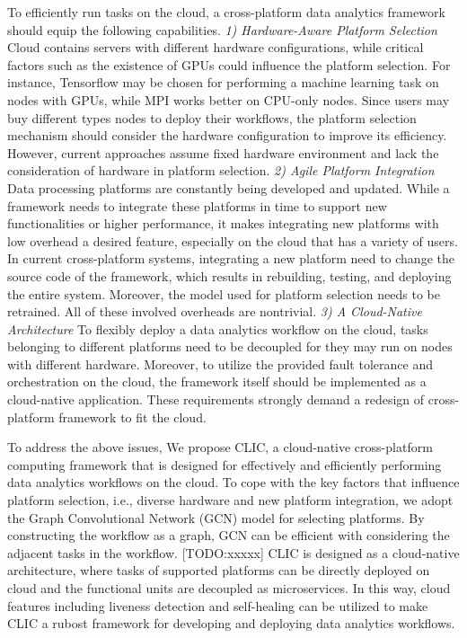 To efficiently run tasks on the cloud, a cross-platform data analytics framework should equip the following capabilities. 
\textit{1) Hardware-Aware Platform Selection} Cloud contains servers with different hardware configurations, while critical factors such as the existence of GPUs could influence the platform selection. For instance, Tensorflow may be chosen for performing a machine learning task on nodes with GPUs, while MPI works better on CPU-only nodes.  Since users may buy different types nodes to deploy their workflows, the platform selection mechanism should consider the hardware configuration to improve its efficiency. However, current approaches assume fixed hardware environment and lack the consideration of hardware in platform selection.  
\textit{2) Agile Platform Integration} Data processing platforms are constantly being developed and updated. While a framework needs to integrate these platforms in time to support new functionalities or higher performance, it makes integrating new platforms with low overhead a desired feature, especially on the cloud that has a variety of users. In current cross-platform systems, integrating a new platform need to change the source code of the framework, which results in rebuilding, testing, and deploying the entire system. Moreover, the model used for platform selection needs to be retrained. All of these involved overheads are nontrivial. 
\textit{3) A Cloud-Native Architecture} To flexibly deploy a data analytics workflow on the cloud, tasks belonging to different platforms need to be decoupled for they may run on nodes with different hardware. Moreover, to utilize the provided fault tolerance and orchestration on the cloud, the framework itself should be implemented as a cloud-native application. These requirements strongly demand a redesign of cross-platform framework to fit the cloud.



To address the above issues, We propose CLIC, a cloud-native cross-platform computing framework that is designed for effectively and efficiently performing data analytics workflows on the cloud.
To cope with the key factors that influence platform selection, i.e., diverse hardware and new platform integration, we adopt the Graph Convolutional Network (GCN) model for selecting platforms. By constructing the workflow as a graph, GCN can be efficient with considering the adjacent tasks in the workflow. [TODO:xxxxx]
CLIC is designed as a cloud-native architecture, where tasks of supported platforms can be directly deployed on cloud and the functional units are decoupled as microservices. In this way, cloud features including liveness detection and self-healing can be utilized to make CLIC a rubost framework for developing and deploying data analytics workflows. 


